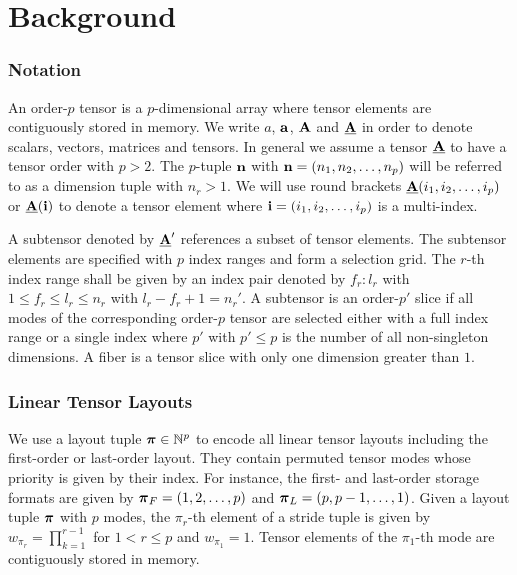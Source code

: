\section{Background}
\label{sec:preliminaries}

\subsubsection{Notation}
An order-$p$ tensor is a $p$-dimensional array \cite{lim:2017:hypermatrices} where tensor elements are contiguously stored in memory. %
We write $a$, $\mathbf{a}$, $\mathbf{A}$ and $\underline{\mathbf{A}}$ in order to denote scalars, vectors, matrices and tensors. 
In general we assume a tensor $\underline{\mathbf{A}}$ to have a tensor order with $p>2$.
The $p$-tuple $\mathbf{n}$ with $\mathbf{n} = (n_1,n_2,\dots,n_p)$ will be referred to as a dimension tuple with $n_r>1$.
We will use round brackets $\underline{\mathbf{A}}(i_1,i_2,\dots,i_p)$ or $\underline{\mathbf{A}}(\mathbf{i})$ to denote a tensor element where $\mathbf{i} = (i_1,i_2,\dots,i_p)$ is a multi-index.

A subtensor denoted by $\underline{\mathbf{A}}'$ references a subset of tensor elements.
The subtensor elements are specified with $p$ index ranges and form a selection grid.
The $r$-th index range shall be given by an index pair denoted by $f_r \colon l_r$ with $1 \leq f_r \leq l_r \leq n_r$ with $l_r - f_r + 1 = n_r'$.
A subtensor is an order-$p'$ slice if all modes of the corresponding order-$p$ tensor are selected either with a full index range or a single index where $p'$ with $p'\leq p$ is the number of all non-singleton dimensions.
A fiber is a tensor slice with only one dimension greater than $1$. 


\subsubsection{Linear Tensor Layouts}

We use a layout tuple $\boldsymbol{\pi} \in \mathbb{N}^p$ to encode all linear tensor layouts including the first-order or last-order layout.
They contain permuted tensor modes whose priority is given by their index.
For instance, the first- and last-order storage formats are given by $\boldsymbol{\pi}_F = (1,2,\dots,p)$ and $\boldsymbol{\pi}_{L} = (p,p-1,\dots,1)$.
Given a layout tuple $\boldsymbol{\pi}$ with $p$ modes, the $\pi_r$-th element of a stride tuple is given by $w_{\pi_r} = \prod_{k=1}^{r-1}$ for $1 < r \leq p$ and $w_{\pi_1} = 1$.
Tensor elements of the $\pi_1$-th mode are contiguously stored in memory.

